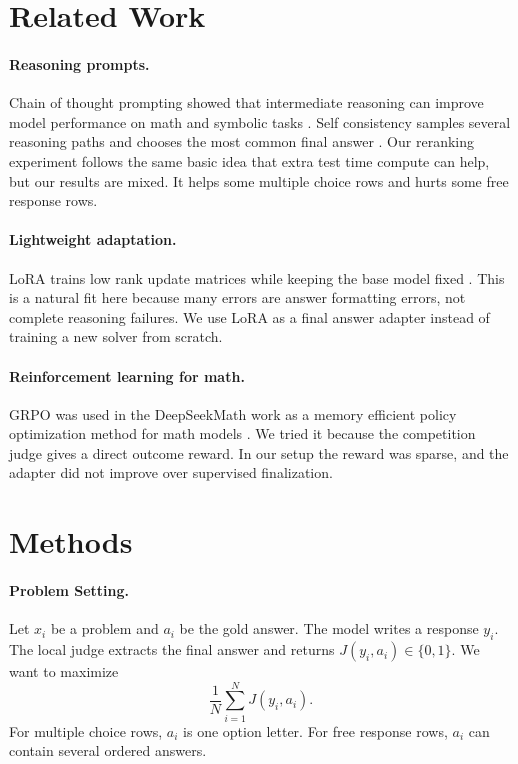 \documentclass[11pt]{article}
\begin{document}
\section{Related Work}
\label{sec:related}

\paragraph{Reasoning prompts.}
Chain of thought prompting showed that intermediate reasoning can improve model performance on math and symbolic tasks \cite{wei2022cot}. Self consistency samples several reasoning paths and chooses the most common final answer \cite{wang2022selfconsistency}. Our reranking experiment follows the same basic idea that extra test time compute can help, but our results are mixed. It helps some multiple choice rows and hurts some free response rows.

\paragraph{Lightweight adaptation.}
LoRA trains low rank update matrices while keeping the base model fixed \cite{hu2021lora}. This is a natural fit here because many errors are answer formatting errors, not complete reasoning failures. We use LoRA as a final answer adapter instead of training a new solver from scratch.

\paragraph{Reinforcement learning for math.}
GRPO was used in the DeepSeekMath work as a memory efficient policy optimization method for math models \cite{shao2024deepseekmath}. We tried it because the competition judge gives a direct outcome reward. In our setup the reward was sparse, and the adapter did not improve over supervised finalization.

\section{Methods}
\label{sec:methods}

\paragraph{Problem Setting.}
Let $x_i$ be a problem and $a_i$ be the gold answer. The model writes a response $y_i$. The local judge extracts the final answer and returns $J(y_i, a_i) \in \{0,1\}$. We want to maximize
\[
    \frac{1}{N}\sum_{i=1}^{N} J(y_i, a_i).
\]
For multiple choice rows, $a_i$ is one option letter. For free response rows, $a_i$ can contain several ordered answers.
\end{document}
